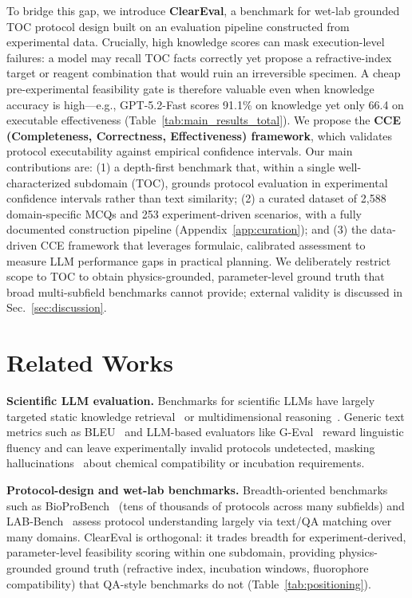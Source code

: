 \documentclass[conference]{IEEEtran}
\begin{document}
To bridge this gap, we introduce \textbf{ClearEval}, a benchmark for wet-lab
grounded TOC protocol design built on an evaluation pipeline constructed from
experimental data. Crucially, high knowledge scores can mask execution-level
failures: a model may recall TOC facts correctly yet propose a refractive-index
target or reagent combination that would ruin an irreversible specimen. A cheap
pre-experimental feasibility gate is therefore valuable even when knowledge
accuracy is high---e.g., GPT-5.2-Fast scores 91.1\% on knowledge yet only 66.4
on executable effectiveness (Table~\ref{tab:main_results_total}). We propose the
\textbf{CCE (Completeness, Correctness, Effectiveness) framework}, which
validates protocol executability against empirical confidence intervals. Our
main contributions are: (1) a depth-first benchmark that, within a single
well-characterized subdomain (TOC), grounds protocol evaluation in experimental
confidence intervals rather than text similarity; (2) a curated dataset of
2{,}588 domain-specific MCQs and 253 experiment-driven scenarios, with a fully
documented construction pipeline (Appendix~\ref{app:curation}); and (3) the
data-driven CCE framework that leverages formulaic, calibrated assessment to
measure LLM performance gaps in practical planning. We deliberately restrict
scope to TOC to obtain physics-grounded, parameter-level ground truth that broad
multi-subfield benchmarks cannot provide; external validity is discussed in
Sec.~\ref{sec:discussion}.

\section{Related Works}\label{sec:related}
\noindent\textbf{Scientific LLM evaluation.} Benchmarks for scientific LLMs
have largely targeted static knowledge
retrieval~\cite{hendrycks2021mmlu,jin2021disease,singhal2023medpalm} or
multidimensional reasoning~\cite{ying2025seedbench}. Generic text metrics such
as BLEU~\cite{papineni2002bleu} and LLM-based evaluators like
G-Eval~\cite{liu2023geval,li2024survey} reward linguistic fluency and can leave
experimentally invalid protocols undetected, masking
hallucinations~\cite{bang2025hallulens,zhang2025survey} about chemical
compatibility or incubation requirements.

\noindent\textbf{Protocol-design and wet-lab benchmarks.} Breadth-oriented
benchmarks such as BioProBench~\cite{bioprobench} (tens of thousands of
protocols across many subfields) and LAB-Bench~\cite{labbench} assess protocol
understanding largely via text/QA matching over many domains. ClearEval is
orthogonal: it trades breadth for experiment-derived, parameter-level
feasibility scoring within one subdomain, providing physics-grounded ground
truth (refractive index, incubation windows, fluorophore compatibility) that
QA-style benchmarks do not (Table~\ref{tab:positioning}).
\end{document}
